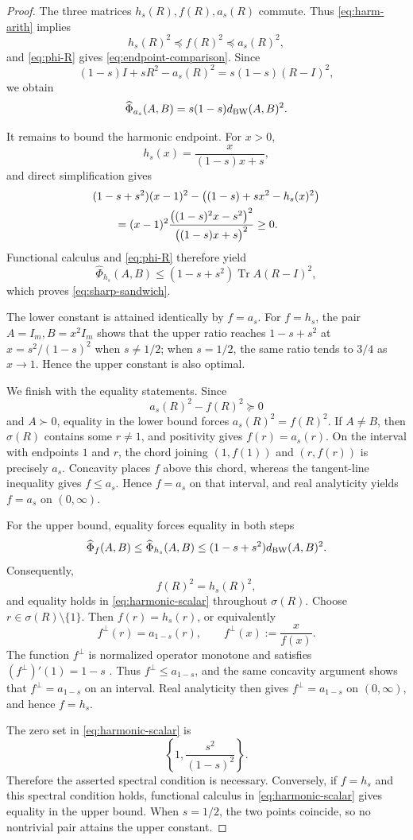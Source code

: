 \documentclass[11pt]{amsart}
\theoremstyle{definition}
\theoremstyle{remark}
\newcommand{\Tr}{\operatorname{Tr}}
\newcommand{\altPhi}{\widehat{\Phi}}
\begin{document}
	\begin{proof}
		The three matrices $h_s(R),f(R),a_s(R)$ commute.  Thus
		\eqref{eq:harm-arith} implies
		\[
		h_s(R)^2\preceq f(R)^2\preceq a_s(R)^2,
		\]
		and \eqref{eq:phi-R} gives \eqref{eq:endpoint-comparison}.  Since
		\[
		(1-s)I+sR^2-a_s(R)^2=s(1-s)(R-I)^2,
		\]
		we obtain
		\begin{equation}\label{eq:arithmetic-endpoint}
			\altPhi_{a_s}(A,B)=s(1-s)d_{\rm BW}(A,B)^2.
		\end{equation}
		
		It remains to bound the harmonic endpoint.  For $x>0$,
		\[
		h_s(x)=\frac{x}{(1-s)x+s},
		\]
		and direct simplification gives
		\begin{align}
			&(1-s+s^2)(x-1)^2
			-\bigl((1-s)+sx^2-h_s(x)^2\bigr) \notag\\
			&\qquad
			=(x-1)^2
			\frac{\bigl((1-s)^2x-s^2\bigr)^2}
			{\bigl((1-s)x+s\bigr)^2}
			\ge0. \label{eq:harmonic-scalar}
		\end{align}
		Functional calculus and \eqref{eq:phi-R} therefore yield
		\[
		\altPhi_{h_s}(A,B)
		\le(1-s+s^2)\Tr A(R-I)^2,
		\]
		which proves \eqref{eq:sharp-sandwich}.
		
		The lower constant is attained identically by $f=a_s$.  For $f=h_s$,
		the pair $A=I_m,B=x^2I_m$ shows that the upper ratio reaches
		$1-s+s^2$ at $x=s^2/(1-s)^2$ when $s\ne1/2$; when $s=1/2$, the
		same ratio tends to $3/4$ as $x\to1$.  Hence the upper constant is also
		optimal.
		
	We finish with the equality statements.  Since
	\[
	a_s(R)^2-f(R)^2\succeq0
	\]
	and $A\succ0$, equality in the lower bound forces
	$a_s(R)^2=f(R)^2$.  If $A\ne B$, then
	$\sigma(R)$ contains some $r\ne1$, and positivity gives
	$f(r)=a_s(r)$.  On the interval with endpoints $1$ and $r$, the
	chord joining $(1,f(1))$ and $(r,f(r))$ is precisely $a_s$.
	Concavity places $f$ above this chord, whereas the tangent-line
	inequality gives $f\le a_s$.  Hence $f=a_s$ on that interval, and
	real analyticity yields $f=a_s$ on $(0,\infty)$.
	
	For the upper bound, equality forces equality in both steps
	\[
	\altPhi_f(A,B)
	\le \altPhi_{h_s}(A,B)
	\le (1-s+s^2)d_{\rm BW}(A,B)^2.
	\]
	Consequently,
	\[
	f(R)^2=h_s(R)^2,
	\]
	and equality holds in \eqref{eq:harmonic-scalar} throughout
	$\sigma(R)$.  Choose $r\in\sigma(R)\setminus\{1\}$.  Then
	$f(r)=h_s(r)$, or equivalently
	\[
	f^\perp(r)=a_{1-s}(r),
	\qquad
	f^\perp(x):=\frac{x}{f(x)}.
	\]
	The function $f^\perp$ is normalized operator monotone and satisfies
	$(f^\perp)'(1)=1-s$
	\cite[Section~3]{DumitruFrancoKimCzerwinska2026}.  Thus
	$f^\perp\le a_{1-s}$, and the same concavity argument shows that
	$f^\perp=a_{1-s}$ on an interval.  Real analyticity then gives
	$f^\perp=a_{1-s}$ on $(0,\infty)$, and hence $f=h_s$.
	
	The zero set in \eqref{eq:harmonic-scalar} is
	\[
	\left\{1,\frac{s^2}{(1-s)^2}\right\}.
	\]
	Therefore the asserted spectral condition is necessary.  Conversely, if
	$f=h_s$ and this spectral condition holds, functional calculus in
	\eqref{eq:harmonic-scalar} gives equality in the upper bound.  When
	$s=1/2$, the two points coincide, so no nontrivial pair attains the
	upper constant.
	\end{proof}
\end{document}
